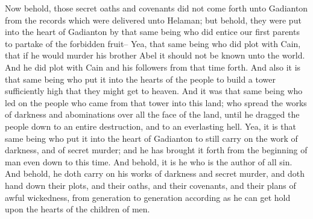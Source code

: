 Now behold, those secret oaths and covenants did not come forth unto Gadianton from the records which were delivered unto Helaman; but behold, they were put into the heart of Gadianton by that same being who did entice our first parents to partake of the forbidden fruit--
\bverse \iffalse Yea, that same being who did plot with Cain, that if he would murder his brother Abel it should not be known unto the world.  And he did plot with Cain and his followers from that time forth. \fi
Yea, that same being who did plot with Cain, that if he would murder his brother Abel it should not be known unto the world.  And he did plot with Cain and his followers from that time forth.
\bverse \iffalse And also it is that same being who put it into the hearts of the people to build a tower sufficiently high that they might get to heaven. And it was that same being who led on the people who came from that tower into this land; who spread the works of darkness and abominations over all the face of the land, until he dragged the people down to an entire destruction, and to an everlasting hell. \fi
And also it is that same being who put it into the hearts of the people to build a tower sufficiently high that they might get to heaven. And it was that same being who led on the people who came from that tower into this land; who spread the works of darkness and abominations over all the face of the land, until he dragged the people down to an entire destruction, and to an everlasting hell.
\bverse \iffalse Yea, it is that same being who put it into the heart of Gadianton to still carry on the work of darkness, and of secret murder; and he has brought it forth from the beginning of man even down to this time. \fi
Yea, it is that same being who put it into the heart of Gadianton to still carry on the work of darkness, and of secret murder; and he has brought it forth from the beginning of man even down to this time.
\bverse \iffalse And behold, it is he who is the author of all sin. And behold, he doth carry on his works of darkness and secret murder, and doth hand down their plots, and their oaths, and their covenants, and their plans of awful wickedness, from generation to generation according as he can get hold upon the hearts of the children of men. \fi
And behold, it is he who is the author of all sin. And behold, he doth carry on his works of darkness and secret murder, and doth hand down their plots, and their oaths, and their covenants, and their plans of awful wickedness, from generation to generation according as he can get hold upon the hearts of the children of men.
